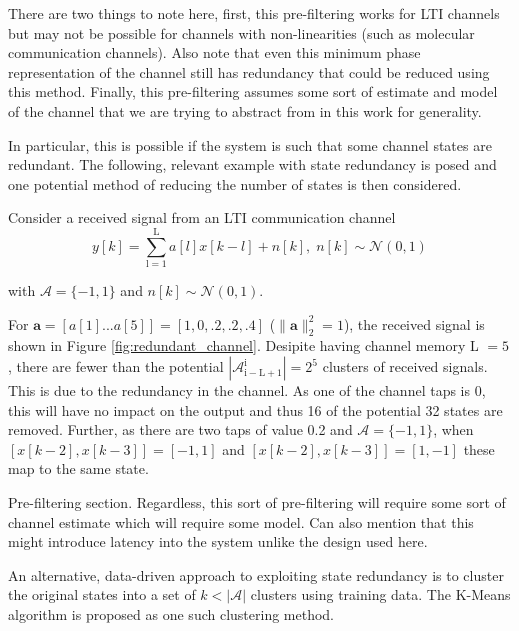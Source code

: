 \documentclass[12pt,a4paper]{report}
\begin{document}
There are two things to note here, first, this pre-filtering works for LTI channels but may not be possible for channels with non-linearities (such as molecular communication channels). Also note that even this minimum phase representation of the channel still has redundancy that could be reduced using this method. Finally, this pre-filtering assumes some sort of estimate and model of the channel that we are trying to abstract from in this work for generality. 

In particular, this is possible if the system is such that some channel states are redundant. The following, relevant example with state redundancy is posed and one potential method of reducing the number of states is then considered. 

Consider a received signal from an LTI communication channel
\begin{equation*}
y[k] = \sum_{\mathrm{l=1}}^{\mathrm{L}} a[l]x[k-l] + n[k], \; n[k]  \sim \mathcal{N}(0,1)
\end{equation*}

with  $\mathcal{A}=\{-1, 1\}$ and $n[k]  \sim \mathcal{N}(0,1)$.  

For $\mathbf{a} = [a[1]...a[5]]=[1, 0, .2, .2, .4]$ ($\|\mathbf{a}\|^2_2 = 1$), the received signal is shown in Figure \ref{fig:redundant_channel}. Desipite having channel memory L $=5$, there are fewer than the potential $|\mathcal{A}_{\mathrm{i-L+1}}^{\mathrm{i}}| =2^5$ clusters of received signals. This is due to the redundancy in the channel.  As one of the channel taps is 0, this will have no impact on the output and thus 16 of the potential 32 states are removed. Further, as there are two taps of value 0.2 and $\mathcal{A}=\{-1, 1\}$, when $[x[k-2],x[k-3]] = [-1,1]$ and $[x[k-2],x[k-3]] = [1,-1]$ these map to the same state. 



\par
Pre-filtering section. Regardless, this sort of pre-filtering will require some sort of channel estimate which will require some model. 
Can also mention that this might introduce latency into the system unlike the design used here. 
\par

An alternative, data-driven approach to exploiting state redundancy is to cluster the original states into a set of $k<|\mathcal{A}|$ clusters using training data. The K-Means algorithm is proposed as one such clustering method.
\\
\end{document}

